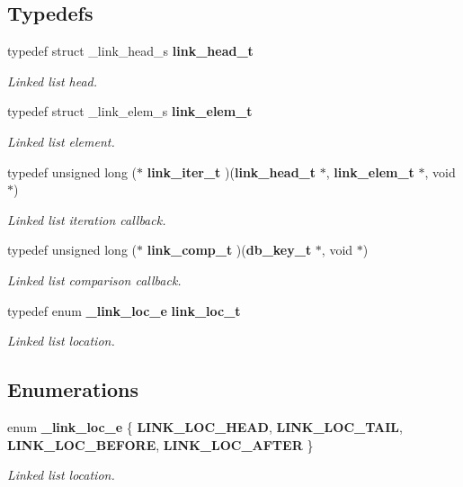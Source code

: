 \subsection*{Typedefs}
\begin{CompactItemize}
\item 
typedef struct \_\-link\_\-head\_\-s {\bf link\_\-head\_\-t}
\begin{CompactList}\small\item\em Linked list head.\item\end{CompactList}\item 
typedef struct \_\-link\_\-elem\_\-s {\bf link\_\-elem\_\-t}
\begin{CompactList}\small\item\em Linked list element.\item\end{CompactList}\item 
typedef unsigned long ($\ast$ {\bf link\_\-iter\_\-t} )({\bf link\_\-head\_\-t} $\ast$, {\bf link\_\-elem\_\-t} $\ast$, void $\ast$)
\begin{CompactList}\small\item\em Linked list iteration callback.\item\end{CompactList}\item 
typedef unsigned long ($\ast$ {\bf link\_\-comp\_\-t} )({\bf db\_\-key\_\-t} $\ast$, void $\ast$)
\begin{CompactList}\small\item\em Linked list comparison callback.\item\end{CompactList}\item 
typedef enum {\bf \_\-link\_\-loc\_\-e} {\bf link\_\-loc\_\-t}
\begin{CompactList}\small\item\em Linked list location.\item\end{CompactList}\end{CompactItemize}
\subsection*{Enumerations}
\begin{CompactItemize}
\item 
enum {\bf \_\-link\_\-loc\_\-e} \{ {\bf LINK\_\-LOC\_\-HEAD}, 
{\bf LINK\_\-LOC\_\-TAIL}, 
{\bf LINK\_\-LOC\_\-BEFORE}, 
{\bf LINK\_\-LOC\_\-AFTER}
 \}
\begin{CompactList}\small\item\em Linked list location.\item\end{CompactList}\end{CompactItemize}
